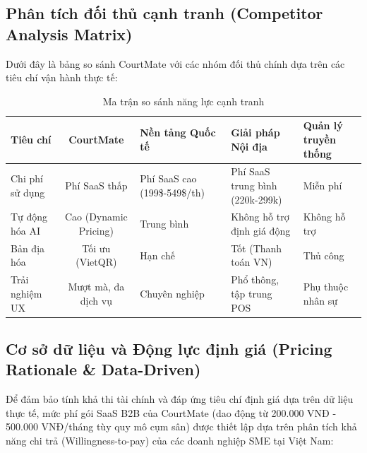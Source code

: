 \subsection{Phân tích đối thủ cạnh tranh (Competitor Analysis Matrix)}
Dưới đây là bảng so sánh CourtMate với các nhóm đối thủ chính dựa trên các tiêu chí vận hành thực tế:

\begin{table}[H]
    \centering
    \renewcommand{\arraystretch}{1.3}
    \begin{tabularx}{\textwidth}{|>{\raggedright\arraybackslash}p{2.5cm}|c|X|X|X|}
    \hline
    \textbf{Tiêu chí} & \textbf{CourtMate} & \textbf{Nền tảng Quốc tế \cite{ref:playtomic, ref:courtreserve}} & \textbf{Giải pháp Nội địa \cite{ref:alobo}} & \textbf{Quản lý truyền thống} \\ \hline
    Chi phí sử dụng & Phí SaaS thấp & Phí SaaS cao (199\$-549\$/th) \cite{ref:playtomic, ref:courtreserve} & Phí SaaS trung bình (220k-299k) \cite{ref:alobo} & Miễn phí \\ \hline
    Tự động hóa AI & Cao (Dynamic Pricing) & Trung bình & Không hỗ trợ định giá động & Không hỗ trợ \\ \hline
    Bản địa hóa & Tối ưu (VietQR) & Hạn chế \cite{ref:playtomic, ref:courtreserve} & Tốt (Thanh toán VN) & Thủ công \\ \hline
    Trải nghiệm UX & Mượt mà, đa dịch vụ & Chuyên nghiệp & Phổ thông, tập trung POS & Phụ thuộc nhân sự \\ \hline
    \end{tabularx}
    \caption{Ma trận so sánh năng lực cạnh tranh}
    \label{tab:competitor_matrix}
\end{table}

\subsection{Cơ sở dữ liệu và Động lực định giá (Pricing Rationale \& Data-Driven)}
Để đảm bảo tính khả thi tài chính và đáp ứng tiêu chí định giá dựa trên dữ liệu thực tế, mức phí gói SaaS B2B của CourtMate (dao động từ 200.000 VNĐ - 500.000 VNĐ/tháng tùy quy mô cụm sân) được thiết lập dựa trên phân tích khả năng chi trả (Willingness-to-pay) của các doanh nghiệp SME tại Việt Nam:

